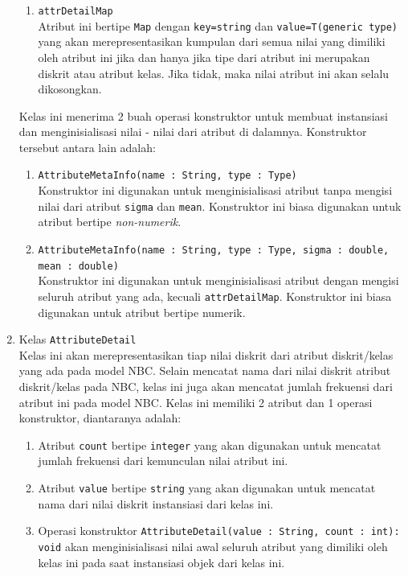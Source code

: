 \begin{enumerate}
\begin{enumerate}
		\item{\texttt{attrDetailMap}}\\
		Atribut ini bertipe \texttt{Map} dengan \texttt{key=string} dan \texttt{value=T(generic type)} yang akan merepresentasikan kumpulan dari semua nilai yang dimiliki oleh atribut ini jika dan hanya jika tipe dari atribut ini merupakan diskrit atau atribut kelas. Jika tidak, maka nilai atribut ini akan selalu dikosongkan.
	\end{enumerate}
	
	Kelas ini menerima 2 buah operasi konstruktor untuk membuat instansiasi dan menginisialisasi nilai - nilai dari atribut di dalamnya. Konstruktor tersebut antara lain adalah:
	\begin{enumerate}
		\item \texttt{AttributeMetaInfo(name : String, type : Type)}\\
		Konstruktor ini digunakan untuk menginisialisasi atribut tanpa mengisi nilai dari atribut \texttt{sigma} dan \texttt{mean}. Konstruktor ini biasa digunakan untuk atribut bertipe \textit{non-numerik}.
		\item \texttt{AttributeMetaInfo(name : String, type : Type, sigma : double, mean : double)}\\
		Konstruktor ini digunakan untuk menginisialisasi atribut dengan mengisi seluruh atribut yang ada, kecuali \texttt{attrDetailMap}. Konstruktor ini biasa digunakan untuk atribut bertipe numerik.
		
	\end{enumerate}
	
	\item{Kelas \texttt{AttributeDetail}}\\
	Kelas ini akan merepresentasikan tiap nilai diskrit dari atribut diskrit/kelas yang ada pada model NBC. Selain mencatat nama dari nilai diskrit atribut diskrit/kelas pada NBC, kelas ini juga akan mencatat jumlah frekuensi dari atribut ini pada model NBC.
	Kelas ini memiliki 2 atribut dan 1 operasi konstruktor, diantaranya adalah:
	\begin{enumerate}
		\item Atribut \texttt{count} bertipe \texttt{integer} yang akan digunakan untuk mencatat jumlah frekuensi dari kemunculan nilai atribut ini.
		\item Atribut \texttt{value} bertipe \texttt{string} yang akan digunakan untuk mencatat nama dari nilai diskrit instansiasi dari kelas ini.
		\item Operasi konstruktor \texttt{AttributeDetail(value : String, count : int): void} akan menginisialisasi nilai awal seluruh atribut yang dimiliki oleh kelas ini pada saat instansiasi objek dari kelas ini.
	\end{enumerate} 
	
\end{enumerate}

